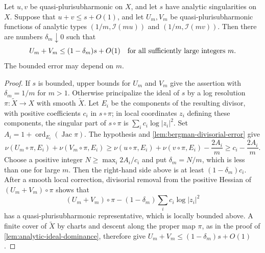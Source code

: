 \begin{lemma}\label{lem:analytic-minorant-product-ideals}
Let $u,v$ be quasi-plurisubharmonic on $X$, and let $s$ have analytic singularities on $X$. Suppose that $u+v\leq s+O(1)$, and let $U_m,V_m$ be quasi-plurisubharmonic functions of analytic types $(1/m,\mathcal I(mu))$ and $(1/m,\mathcal I(mv))$. Then there are numbers $\delta_m\downarrow0$ such that
\[
 U_m+V_m\leq(1-\delta_m)s+O(1)
 \quad\hbox{for all sufficiently large integers }m.
\]
The bounded error may depend on $m$.
\end{lemma}
\begin{proof}
If $s$ is bounded, upper bounds for $U_m$ and $V_m$ give the assertion with $\delta_m=1/m$ for $m>1$. Otherwise principalize the ideal of $s$ by a log resolution $\pi\colon\widetilde X\to X$ with smooth $\widetilde X$. Let $E_i$ be the components of the resulting divisor, with positive coefficients $c_i$ in $s\circ\pi$; in local coordinates $z_i$ defining these components, the singular part of $s\circ\pi$ is $\sum_i c_i\log|z_i|^2$. Set
$A_i=1+\operatorname{ord}_{E_i}(\operatorname{Jac}\pi)$.
The hypothesis and \cref{lem:bergman-divisorial-error} give
\[
 \nu(U_m\circ\pi,E_i)+\nu(V_m\circ\pi,E_i)
 \geq\nu(u\circ\pi,E_i)+\nu(v\circ\pi,E_i)-\frac{2A_i}{m}
 \geq c_i-\frac{2A_i}{m}.
\]
Choose a positive integer $N\geq\max_i2A_i/c_i$ and put $\delta_m=N/m$, which is less than one for large $m$. Then the right-hand side above is at least $(1-\delta_m)c_i$. After a smooth local correction, divisorial removal from the positive Hessian of $(U_m+V_m)\circ\pi$ shows that
\[
 (U_m+V_m)\circ\pi-(1-\delta_m)\sum_i c_i\log|z_i|^2
\]
has a quasi-plurisubharmonic representative, which is locally bounded above. A finite cover of $\widetilde X$ by charts and descent along the proper map $\pi$, as in the proof of \cref{lem:analytic-ideal-dominance}, therefore give $U_m+V_m\leq(1-\delta_m)s+O(1)$.
\end{proof}
